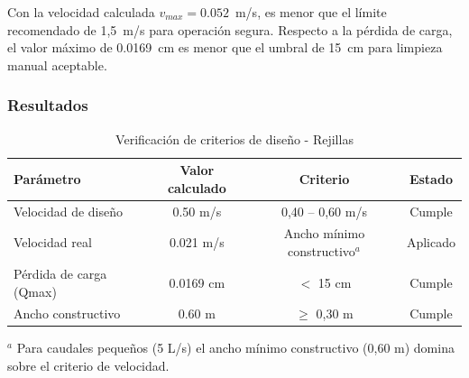 \documentclass[12pt,a4paper]{article}
\begin{document}
Con la velocidad calculada $v_{max} = 0.052$~m/s, es menor que el límite recomendado de 1,5~m/s para operación segura. Respecto a la pérdida de carga, el valor máximo de 0.0169~cm es menor que el umbral de 15~cm para limpieza manual aceptable.

\subsubsection{Resultados}

\begin{table}[H]
\centering
\caption{Verificación de criterios de diseño - Rejillas}
\begin{tabular}{lccc}
\toprule
Parámetro & Valor calculado & Criterio & Estado \\
\midrule
Velocidad de diseño & 0.50 m/s & 0,40 -- 0,60 m/s & Cumple \\
Velocidad real & 0.021 m/s & Ancho mínimo constructivo$^a$ & Aplicado \\
Pérdida de carga (Qmax) & 0.0169 cm & $<$ 15 cm & Cumple \\
Ancho constructivo & 0.60 m & $\geq$ 0,30 m & Cumple \\
\bottomrule
\end{tabular}
\small
$^a$ Para caudales pequeños (5 L/s) el ancho mínimo constructivo (0,60 m) domina sobre el criterio de velocidad.
\end{table}
\end{document}
